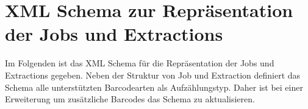\chapter{XML Schema zur Repräsentation der Jobs und Extractions}
\label{annex:xml-schema}
\writtenby{\dcauthornameewie}%
Im Folgenden ist das XML Schema für die Repräsentation der Jobs und Extractions gegeben.
Neben der Struktur von Job und Extraction definiert das Schema alle unterstützten Barcodearten als Aufzählungstyp.
Daher ist bei einer Erweiterung um zusätzliche Barcodes das Schema zu aktualisieren.


